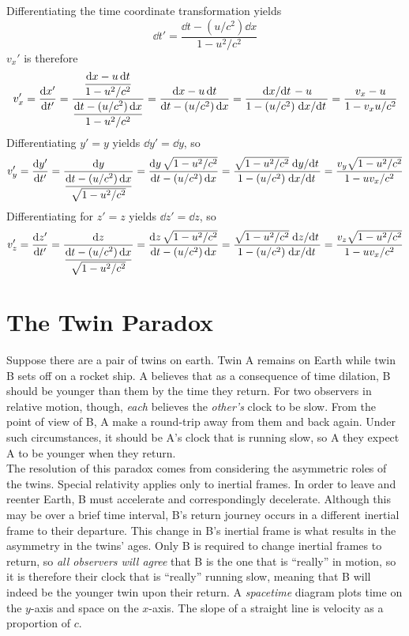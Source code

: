 \documentclass{subfiles}
\begin{document}
				Differentiating the time coordinate transformation yields
				\[\dd{t'} = \frac{\dd{t} - \left(u/c^2\right)\dd{x}}{1 - u^2/c^2}\]
				\(v_x'\) is therefore
				\[
					v_x' = \dv{x'}{t'}
							= \frac{\dfrac{\dd{x} - u\dd{t}}{1 - u^2/c^2}}{\dfrac{\dd{t} - (u/c^2)\dd{x}}{1 - u^2/c^2}}
							= \frac{\dd{x} - u\dd{t}}{\dd{t} - (u/c^2)\dd{x}}
							= \frac{\dv*{x}{t} - u}{1 - (u/c^2)\dv*{x}{t}}
							= \frac{v_x - u}{1 - v_xu/c^2}	
				\]
				Differentiating \(y' = y\) yields \(\dd{y'} = \dd{y}\), so
				\[
					v_y' = \dv{y'}{t'}
							= \frac{\dd{y}}{\dfrac{\dd{t} - (u/c^2)\dd{x}}{\sqrt{1 - u^2/c^2}}}
							= \frac{\dd{y}\sqrt{1 - u^2/c^2}}{\dd{t} - (u/c^2)\dd{x}}
							= \frac{\sqrt{1 - u^2/c^2}\dv*{y}{t}}{1 - (u/c^2)\dv*{x}{t}}
							= \frac{v_y\sqrt{1 - u^2/c^2}}{1 - uv_x/c^2}
				\]
				Differentiating for \(z' = z\) yields \(\dd{z'} = \dd{z}\), so
				\[
					v_z' = \dv{z'}{t'}
							= \frac{\dd{z}}{\dfrac{\dd{t} - (u/c^2)\dd{x}}{\sqrt{1 - u^2/c^2}}}
							= \frac{\dd{z}\sqrt{1 - u^2/c^2}}{\dd{t} - (u/c^2)\dd{x}}
							= \frac{\sqrt{1 - u^2/c^2}\dv*{z}{t}}{1 - (u/c^2)\dv*{x}{t}}
							= \frac{v_z\sqrt{1 - u^2/c^2}}{1 - uv_x/c^2}
				\]
	\section{The Twin Paradox}
		Suppose there are a pair of twins on earth. Twin A remains on Earth while twin B sets off on a rocket ship. A believes that as a consequence of time dilation, B should be younger than them by the time they return. For two observers in relative motion, though, \textit{each} believes the \textit{other's} clock to be slow. From the point of view of B, A make a round-trip away from them and back again. Under such circumstances, it should be A's clock that is running slow, so A they expect A to be younger when they return. \\
			The resolution of this paradox comes from considering the asymmetric roles of the twins. Special relativity applies only to inertial frames. In order to leave and reenter Earth, B must accelerate and correspondingly decelerate. Although this may be over a brief time interval, B's return journey occurs in a different inertial frame to their departure. This change in B's inertial frame is what results in the asymmetry in the twins' ages. Only B is required to change inertial frames to return, so \textit{all observers will agree} that B is the one that is \enquote{really} in motion, so it is therefore their clock that is \enquote{really} running slow, meaning that B will indeed be the younger twin upon their return.
			A \textit{spacetime} diagram plots time on the \(y\)-axis and space on the \(x\)-axis. The slope of a straight line is velocity as a proportion of \(c\).
\end{document}
